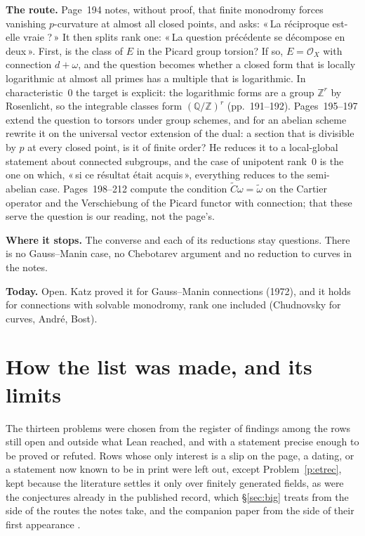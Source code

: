 \documentclass[11pt]{article}
\newcommand{\q}[1]{«\,#1\,»}
\theoremstyle{definition}
\theoremstyle{plain}\newtheorem*{proposition}{Proposition}\theoremstyle{definition}
\newcommand{\entry}[1]{\par\medskip\noindent\textbf{#1}\enspace}
\begin{document}
\entry{The route.} Page~194 notes, without proof, that finite monodromy forces vanishing $p$-curvature at almost all closed points, and asks: \q{La réciproque est-elle vraie ?} It then splits rank one: \q{La question précédente se décompose en deux}. First, is the class of $E$ in the Picard group torsion? If so, $E = \mathcal O_X$ with connection $d + \omega$, and the question becomes whether a closed form that is locally logarithmic at almost all primes has a multiple that is logarithmic. In characteristic~$0$ the target is explicit: the logarithmic forms are a group $\mathbb Z^r$ by Rosenlicht, so the integrable classes form $(\mathbb Q/\mathbb Z)^r$ (pp.~191--192). Pages~195--197 extend the question to torsors under group schemes, and for an abelian scheme rewrite it on the universal vector extension of the dual: a section that is divisible by $p$ at every closed point, is it of finite order? He reduces it to a local-global statement about connected subgroups, and the case of unipotent rank~$0$ is the one on which, \q{si ce résultat était acquis}, everything reduces to the semi-abelian case. Pages~198--212 compute the condition $\tilde C\omega = \tilde\omega$ on the Cartier operator and the Verschiebung of the Picard functor with connection; that these serve the question is our reading, not the page's.

\entry{Where it stops.} The converse and each of its reductions stay questions. There is no Gauss--Manin case, no Chebotarev argument and no reduction to curves in the notes.

\entry{Today.} Open. Katz proved it for Gauss--Manin connections (1972), and it holds for connections with solvable monodromy, rank one included (Chudnovsky for curves, André, Bost).

\section{How the list was made, and its limits}

The thirteen problems were chosen from the register of findings among the rows still open and outside what Lean reached, and with a statement precise enough to be proved or refuted. Rows whose only interest is a slip on the page, a dating, or a statement now known to be in print were left out, except Problem~\ref{p:etrec}, kept because the literature settles it only over finitely generated fields, as were the conjectures already in the published record, which \S\ref{sec:big} treats from the side of the routes the notes take, and the companion paper from the side of their first appearance \cite{huacicm}.
\end{document}
